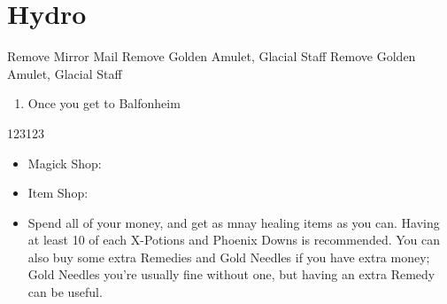 \chapter{Hydro}

\begin{equip}
\begin{itemize}
\vaanf Remove Mirror Mail
\penelof Remove Golden Amulet, Glacial Staff
\ashef Remove Golden Amulet, Glacial Staff
\end{itemize}
\end{equip}
\begin{liscense}
\begin{itemize}
	\end{itemize}
\end{liscense}
\begin{enumerate}
\item Once you get to Balfonheim
\end{enumerate}
\begin{shop}{123123}
	\begin{itemize}
	\item Magick Shop:
	\item Item Shop:
	\item Spend all of your money, and get as mnay healing items as you can. Having at least 10 of each X-Potions and Phoenix Downs is recommended. You can also buy some extra Remedies and Gold Needles if you have extra money; Gold Needles you're usually fine without one, but having an extra Remedy can be useful.
	\end{itemize}
\end{shop}
